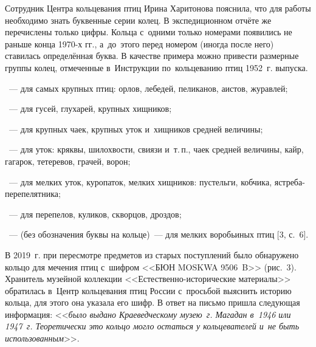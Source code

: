 Сотрудник Центра кольцевания птиц Ирина Харитонова пояснила, что для работы необходимо знать буквенные серии колец. В экспедиционном отчёте же перечислены только цифры. Кольца с~одними только номерами появились не раньше конца 1970-х гг., а~до~этого перед номером (иногда после него) ставилась определённая буква. В качестве примера можно привести размерные группы колец, отмеченные в~Инструкции по~кольцеванию птиц 1952~г. выпуска.\enlargethispage{\baselineskip}
\begin{description}[noitemsep]\vspace{-10pt}
\item[Серия <<А>>]~--- для самых крупных птиц: орлов, лебедей, пеликанов, аистов, журавлей;
\item[Серия <<В>>]~--- для гусей, глухарей, крупных хищников;
\item[Серия <<С>>]~--- для крупных чаек, крупных уток и~хищников средней величины;
\item[Серия <<D>>]~--- для уток: кряквы, шилохвости, свиязи и~т.\,п., чаек средней величины, кайр, гагарок, тетеревов, грачей, ворон;
\item[Серия <<Е>>]~--- для мелких уток, куропаток, мелких хищников: пустельги, кобчика, ястреба-перепелятника;

\item[Серия <<F>>]~--- для перепелов, куликов, скворцов, дроздов;
\item[Серия <<G>>]~--- (без обозначения буквы на кольце)~--- для мелких воробьиных птиц [3, с.~6].\enlargethispage{2\baselineskip}
\end{description}\vspace{-8pt}




В 2019~г. при пересмотре предметов из старых поступлений было обнаружено кольцо для мечения птиц с~шифром <<БЮН MOSKWA 9506~B>> (рис.~3). Хранитель музейной коллекции <<Естественно-исторические материалы>> обратилась в~Центр кольцевания птиц России с~просьбой выяснить историю кольца, для этого она указала его шифр. В ответ на письмо пришла следующая информация: <<\textit{ было выдано Краеведческому музею~г. Магадан в~1946 или 1947~г. Теоретически это кольцо могло остаться у кольцевателей и~не быть использованным}>>.



